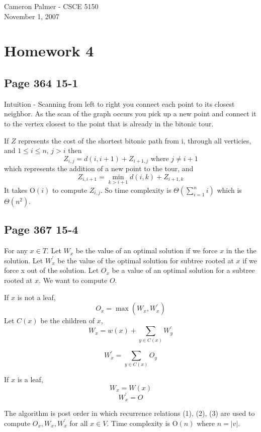 \documentclass[12pt,twoside,letterpaper]{article}
\begin{document}
Cameron Palmer - CSCE 5150\\
November 1, 2007
\section*{Homework 4}
\subsection*{Page 364 15-1}
Intuition - Scanning from left to right you connect each point to its closest neighbor. As the scan of the graph occurs you pick up a new point and connect it to the vertex closest to the point that is already in the bitonic tour.

If $Z$ represents the cost of the shortest bitonic path from i, through all verticies, and $1 \le i \le n$, $j > i$ then
$$Z_{i,j} = d(i,i+1) + Z_{i+1,j} \textrm{ where } j \ne i+1$$
which represents the addition of a new point to the tour, and
$$Z_{i,i+1} = \min_{k>i+1}{d(i,k) + Z_{i+1,k}}$$
It takes $\textrm{O}(i)$ to compute $Z_{i,j}$. So time complexity is $\Theta(\sum_{i=1}^n i)$ which is $\Theta(n^2)$.

\subsection*{Page 367 15-4}
For any $x \in T$. Let $W_x$ be the value of an optimal solution if we force $x$ in the the solution. Let $W_x^\prime$ be the value of the optimal solution for subtree rooted at $x$ if we force x out of the solution. Let $O_x$ be a value of an optimal solution for a subtree rooted at $x$. We want to compute $O$.

If $x$ is not a leaf,
\begin{equation}
O_x = \max(W_x,W_x^\prime)
\end{equation}
Let $C(x)$ be the children of $x$,
\begin{equation}
W_x = w(x) + \sum_{y \in C(x)} W_y^\prime
\end{equation}

\begin{equation}
W_x^\prime = \sum_{y \in C(x)} O_y
\end{equation}

If $x$ is a leaf,
$$W_x= W(x)$$
$$W_x^\prime = O$$

The algorithm is post order in which recurrence relations (1), (2), (3) are used to compute $O_x, W_x, W_x^\prime$ for all $x \in V$. Time complexity is $\textrm{O}(n)$ where $n = |v|$.
\end{document}

